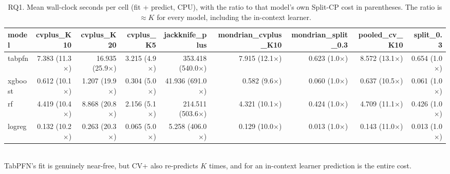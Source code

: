 \begin{table}[t]
\centering
\small
\caption{RQ1. Mean wall-clock seconds per cell (fit + predict, CPU), with the ratio to that model's own Split-CP cost in parentheses. The ratio is $\approx K$ for every model, including the in-context learner.}
\label{tab:cost}
\begin{tabular}{lrrrrrrrr}
\toprule
model & cvplus\_K10 & cvplus\_K20 & cvplus\_K5 & jackknife\_plus & mondrian\_cvplus\_K10 & mondrian\_split\_0.3 & pooled\_cv\_K10 & split\_0.3 \\
\midrule
tabpfn & 7.383 (11.3$\times$) & 16.935 (25.9$\times$) & 3.215 (4.9$\times$) & 353.418 (540.0$\times$) & 7.915 (12.1$\times$) & 0.623 (1.0$\times$) & 8.572 (13.1$\times$) & 0.654 (1.0$\times$) \\
xgboost & 0.612 (10.1$\times$) & 1.207 (19.9$\times$) & 0.304 (5.0$\times$) & 41.936 (691.0$\times$) & 0.582 (9.6$\times$) & 0.060 (1.0$\times$) & 0.637 (10.5$\times$) & 0.061 (1.0$\times$) \\
rf & 4.419 (10.4$\times$) & 8.868 (20.8$\times$) & 2.156 (5.1$\times$) & 214.511 (503.6$\times$) & 4.321 (10.1$\times$) & 0.424 (1.0$\times$) & 4.709 (11.1$\times$) & 0.426 (1.0$\times$) \\
logreg & 0.132 (10.2$\times$) & 0.263 (20.3$\times$) & 0.065 (5.0$\times$) & 5.258 (406.0$\times$) & 0.129 (10.0$\times$) & 0.013 (1.0$\times$) & 0.143 (11.0$\times$) & 0.013 (1.0$\times$) \\
\bottomrule
\end{tabular}
\\[2pt]\footnotesize TabPFN's fit is genuinely near-free, but CV+ also re-predicts $K$ times, and for an in-context learner prediction is the entire cost.
\end{table}
